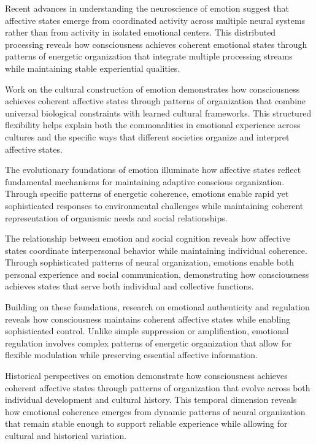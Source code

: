 Recent advances in understanding the neuroscience of emotion \cite{Fox2019, kukushkin2024massed} suggest that affective states emerge from coordinated activity across multiple neural systems rather than from activity in isolated emotional centers. This distributed processing reveals how consciousness achieves coherent emotional states through patterns of energetic organization that integrate multiple processing streams while maintaining stable experiential qualities.

Work on the cultural construction of emotion \cite{Lutz1988, van2025processes} demonstrates how consciousness achieves coherent affective states through patterns of organization that combine universal biological constraints with learned cultural frameworks. This structured flexibility helps explain both the commonalities in emotional experience across cultures and the specific ways that different societies organize and interpret affective states.

The evolutionary foundations of emotion \cite{Panksepp1998, hunt2024electromagnetic} illuminate how affective states reflect fundamental mechanisms for maintaining adaptive conscious organization. Through specific patterns of energetic coherence, emotions enable rapid yet sophisticated responses to environmental challenges while maintaining coherent representation of organismic needs and social relationships.

The relationship between emotion and social cognition \cite{Scherer2014, bosl2025dynamical} reveals how affective states coordinate interpersonal behavior while maintaining individual coherence. Through sophisticated patterns of neural organization, emotions enable both personal experience and social communication, demonstrating how consciousness achieves states that serve both individual and collective functions.

Building on these foundations, research on emotional authenticity and regulation \cite{Ekman2003, zheng2025unbearable} reveals how consciousness maintains coherent affective states while enabling sophisticated control. Unlike simple suppression or amplification, emotional regulation involves complex patterns of energetic organization that allow for flexible modulation while preserving essential affective information.

Historical perspectives on emotion \cite{Reddy2001, amil2024theta} demonstrate how consciousness achieves coherent affective states through patterns of organization that evolve across both individual development and cultural history. This temporal dimension reveals how emotional coherence emerges from dynamic patterns of neural organization that remain stable enough to support reliable experience while allowing for cultural and historical variation.

